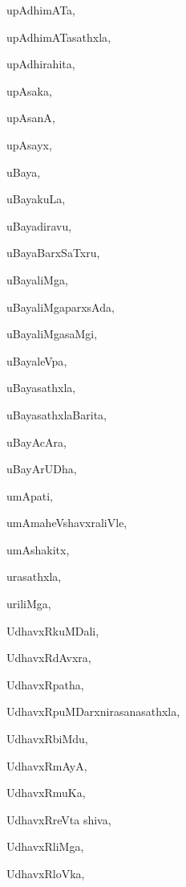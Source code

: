\begin{multicols}{2}
{upAdhimATa}, \pageref{upAdhimATa}

{upAdhimATasathxla}, \pageref{upAdhimATasathxla}

{upAdhirahita}, \pageref{upAdhirahita}

{upAsaka}, \pageref{upAsaka}

{upAsanA}, \pageref{upAsanA}

{upAsayx}, \pageref{upAsayx}

{uBaya}, \pageref{uBaya}

{uBayakuLa}, \pageref{uBayakuLa}

{uBayadiravu}, \pageref{uBayadiravu}

{uBayaBarxSaTxru}, \pageref{uBayaBarxSaTxru}

{uBayaliMga}, \pageref{uBayaliMga}

{uBayaliMgaparxsAda}, \pageref{uBayaliMgaparxsAda}

{uBayaliMgasaMgi}, \pageref{uBayaliMgasaMgi}

{uBayaleVpa}, \pageref{uBayaleVpa}

{uBayasathxla}, \pageref{uBayasathxla}

{uBayasathxlaBarita}, \pageref{uBayasathxlaBarita}

{uBayAcAra}, \pageref{uBayAcAra}

{uBayArUDha}, \pageref{uBayArUDha}

{umApati}, \pageref{umApati}

{umAmaheVshavxraliVle}, \pageref{umAmaheVshavxraliVle}

{umAshakitx}, \pageref{umAshakitx}

{urasathxla}, \pageref{urasathxla}

{uriliMga}, \pageref{uriliMga}

{UdhavxRkuMDali}, \pageref{UdhavxRkuMDali}

{UdhavxRdAvxra}, \pageref{UdhavxRdAvxra}

{UdhavxRpatha}, \pageref{UdhavxRpatha}

{UdhavxRpuMDarxnirasanasathxla}, \pageref{UdhavxRpuMDarxnirasanasathxla}

{UdhavxRbiMdu}, \pageref{UdhavxRbiMdu}

{UdhavxRmAyA}, \pageref{UdhavxRmAyA}

{UdhavxRmuKa}, \pageref{UdhavxRmuKa}

{UdhavxRreVta shiva}, \pageref{UdhavxRreVta shiva}

{UdhavxRliMga}, \pageref{UdhavxRliMga}

{UdhavxRloVka}, \pageref{UdhavxRloVka}


\end{multicols}
